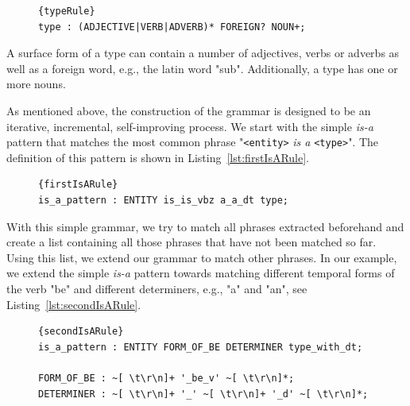 
\begin{figure}
\begin{lstlisting}[label=lst:typeRule, caption=The grammar rule defining a type surface form.]{typeRule}
type : (ADJECTIVE|VERB|ADVERB)* FOREIGN? NOUN+;
\end{lstlisting}
\end{figure}

A surface form of a type can contain a number of adjectives, verbs or adverbs as well as a foreign word, e.g., the latin word "sub".
Additionally, a type has one or more nouns.

As mentioned above, the construction of the grammar is designed to be an iterative, incremental, self-improving process.
We start with the simple \emph{is-a} pattern that matches the most common phrase "\texttt{<entity>} \emph{is a} \texttt{<type>}". 
The definition of this pattern is shown in Listing~\ref{lst:firstIsARule}.
\begin{figure}
\begin{lstlisting}[label=lst:firstIsARule,caption=First simple version of the \emph{is-a} pattern. \texttt{ENTITY} is a marking for the entities position.]{firstIsARule}
is_a_pattern : ENTITY is_is_vbz a_a_dt type;
\end{lstlisting}
\end{figure}

With this simple grammar, we try to match all phrases extracted beforehand and create a list containing all those phrases that have not been matched so far.
Using this list, we extend our grammar to match other phrases.
In our example, we extend the simple \emph{is-a} pattern towards matching different temporal forms of the verb "be" and different determiners, e.g., "a" and "an", see Listing~\ref{lst:secondIsARule}.

\begin{figure}
\begin{lstlisting}[label=lst:secondIsARule,caption=Extended version of the \emph{is-a} pattern.]{secondIsARule}
is_a_pattern : ENTITY FORM_OF_BE DETERMINER type_with_dt;

FORM_OF_BE : ~[ \t\r\n]+ '_be_v' ~[ \t\r\n]*;
DETERMINER : ~[ \t\r\n]+ '_' ~[ \t\r\n]+ '_d' ~[ \t\r\n]*;
\end{lstlisting}
\end{figure}

